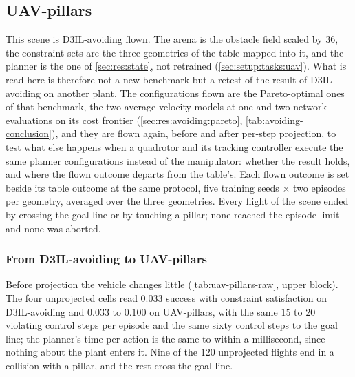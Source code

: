 \subsection{UAV-pillars}\label{sec:res:uav:pillars}

This scene is D3IL-avoiding flown. The arena is the obstacle field scaled by $36$, the constraint sets are
the three geometries of the table mapped into it, and the planner is the one of \autoref{sec:res:state},
not retrained (\autoref{sec:setup:tasks:uav}). What is read here is therefore not a new benchmark but a
retest of the result of D3IL-avoiding on another plant. The configurations flown are the Pareto-optimal ones
of that benchmark, the two average-velocity models at one and two network evaluations on its cost frontier
(\autoref{sec:res:avoiding:pareto}, \autoref{tab:avoiding-conclusion}), and they are flown again, before and
after per-step projection, to test what else happens when a quadrotor and its tracking controller execute the
same planner configurations instead of the manipulator: whether the result holds, and where the flown outcome departs from the
table's. Each flown outcome is set beside its table outcome at the same protocol, five training seeds $\times$
two episodes per geometry, averaged over the three geometries. Every flight of the scene ended by crossing the goal line
or by touching a pillar; none reached the episode limit and none was aborted.

\subsubsection{From D3IL-avoiding to UAV-pillars}\label{sec:res:uav:models}

Before projection the vehicle changes little (\autoref{tab:uav-pillars-raw}, upper block). The four
unprojected cells read $0.033$ success with constraint satisfaction on D3IL-avoiding and $0.033$ to
$0.100$ on UAV-pillars, with the same $15$ to $20$ violating control steps per episode and the same sixty
control steps to the goal line; the planner's time per action is the same to within a millisecond, since
nothing about the plant enters it. Nine of the $120$ unprojected flights end in a collision with a pillar,
and the rest cross the goal line.

